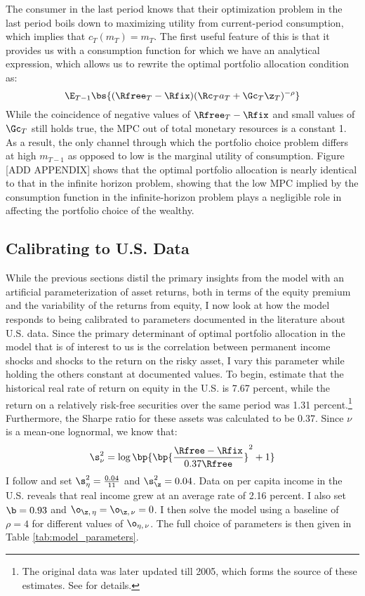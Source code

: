 The consumer in the last period knows that their optimization problem in the last period boils down to maximizing utility from current-period consumption, which implies that $c_T(m_T) = m_T$. The first useful feature of this is that it provides us with a consumption function for which we have an analytical expression, which allows us to rewrite the optimal portfolio allocation condition as:
\[
\E_{T-1}\bs{(\Rfree_{T} - \Rfix)(\Rc_{T}a_{T} + \Gc_{T}\z_{T})^{-\rho}}
\]
While the coincidence of negative values of $\Rfree_{T} - \Rfix$ and small values of $\Gc_{T}$ still holds true, the MPC out of total monetary resources is a constant 1. As a result, the only channel through which the portfolio choice problem differs at high $m_{T-1}$ as opposed to low is the marginal utility of consumption. Figure [ADD APPENDIX] shows that the optimal portfolio allocation is nearly identical to that in the infinite horizon problem, showing that the low MPC implied by the consumption function in the infinite-horizon problem plays a negligible role in affecting the portfolio choice of the wealthy.

\subsection{Calibrating to U.S. Data}

While the previous sections distil the primary insights from the model with an artificial parameterization of asset returns, both in terms of the equity premium and the variability of the returns from equity, I now look at how the model responds to being calibrated to parameters documented in the literature about U.S. data. Since the primary determinant of optimal portfolio allocation in the model that is of interest to us is the correlation between permanent income shocks and shocks to the return on the risky asset, I vary this parameter while holding the others constant at documented values. To begin, \citet{Mehra1985} estimate that the historical real rate of return on equity in the U.S. is 7.67 percent, while the return on a relatively risk-free securities over the same period was 1.31 percent.\footnote{The original data was later updated till 2005, which forms the source of these estimates. See \citet{Mehra2006} for details.} Furthermore, the Sharpe ratio for these assets was calculated to be 0.37. Since $\nu$ is a mean-one lognormal, we know that:
\[
\s_{\nu}^2 = \log\bp{\bp{\frac{\Rfree - \Rfix}{0.37\Rfree}}^2 + 1}
\]
I follow \citet{Carroll2015} and set $\s_{\eta}^2 = \frac{0.04}{11}$ and $\s_{\z}^2 = 0.04$. Data on per capita income in the U.S. reveals that real income grew at an average rate of 2.16 percent. I also set $\b = 0.93$ and $\o_{\z,\,\eta} = \o_{\z,\,\nu} = 0$. I then solve the model using a baseline of $\rho = 4$ for different values of $\o_{\eta,\,\nu}$. The full choice of parameters is then given in Table \ref{tab:model_parameters}.

